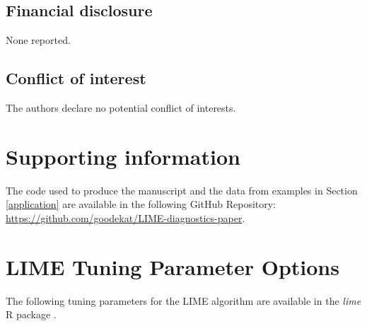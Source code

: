 \documentclass[AMS,STIX2COL]{WileyNJD-v2}\usepackage[]{graphicx}\usepackage[]{color}
\begin{document}
\subsection*{Financial disclosure}

None reported.

\subsection*{Conflict of interest}

The authors declare no potential conflict of interests.

\section*{Supporting information}

The code used to produce the manuscript and the data from examples in Section \ref{application} are available in the following GitHub Repository: \href{https://github.com/goodekat/LIME-diagnostics-paper}{https://github.com/goodekat/LIME-diagnostics-paper}.



\newpage

\appendix

\section{LIME Tuning Parameter Options} \label{lime-details}

The following tuning parameters for the LIME algorithm are available in the \emph{lime} R package \citep{pedersen:2020}.
\end{document}
